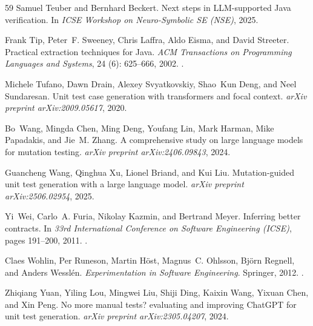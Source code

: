\documentclass[11pt]{article}
\begin{document}
\begin{thebibliography}{59}
Samuel Teuber and Bernhard Beckert.
\newblock Next steps in {LLM}-supported {Java} verification.
\newblock In \emph{ICSE Workshop on Neuro-Symbolic SE (NSE)}, 2025.

Frank Tip, Peter~F. Sweeney, Chris Laffra, Aldo Eisma, and David Streeter.
\newblock Practical extraction techniques for {Java}.
\newblock \emph{ACM Transactions on Programming Languages and Systems},
  24 (6): 625--666, 2002.
\newblock {}.

Michele Tufano, Dawn Drain, Alexey Svyatkovskiy, Shao~Kun Deng, and Neel
  Sundaresan.
\newblock Unit test case generation with transformers and focal context.
\newblock \emph{arXiv preprint arXiv:2009.05617}, 2020.

Bo~Wang, Mingda Chen, Ming Deng, Youfang Lin, Mark Harman, Mike Papadakis, and
  Jie~M. Zhang.
\newblock A comprehensive study on large language models for mutation testing.
\newblock \emph{arXiv preprint arXiv:2406.09843}, 2024.

Guancheng Wang, Qinghua Xu, Lionel Briand, and Kui Liu.
\newblock Mutation-guided unit test generation with a large language model.
\newblock \emph{arXiv preprint arXiv:2506.02954}, 2025.

Yi~Wei, Carlo~A. Furia, Nikolay Kazmin, and Bertrand Meyer.
\newblock Inferring better contracts.
\newblock In \emph{33rd International Conference on Software Engineering
  (ICSE)}, pages 191--200, 2011.
\newblock {}.

Claes Wohlin, Per Runeson, Martin H{\"o}st, Magnus~C. Ohlsson, Bj{\"o}rn
  Regnell, and Anders Wessl{\'e}n.
\newblock \emph{Experimentation in Software Engineering}.
\newblock Springer, 2012.
\newblock {}.

Zhiqiang Yuan, Yiling Lou, Mingwei Liu, Shiji Ding, Kaixin Wang, Yixuan Chen,
  and Xin Peng.
\newblock No more manual tests? evaluating and improving {ChatGPT} for unit
  test generation.
\newblock \emph{arXiv preprint arXiv:2305.04207}, 2024.


\end{thebibliography}
\end{document}
